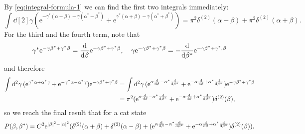 \documentclass[hyperref, a4paper]{article}
\newcommand*{\ee}{\mathrm{e}}
\begin{document}
\begin{itemize}
\[    \]
    By \eqref{eq:integral-formula-1} we can find the first two integrals immediately:
    \[
        \int \dd[2]{\gamma} (\ee^{-\gamma^* (\alpha - \beta) + \gamma (\alpha^* - \beta^*)} + \ee^{\gamma^* (\alpha + \beta) - \gamma (\alpha^* + \beta^*)} ) = \pi^2 \delta^{(2)}(\alpha - \beta) + \pi^2 \delta^{(2)}(\alpha + \beta).
    \]
    For the third and the fourth term, note that 
    \[
        \gamma^* \ee^{- \gamma \beta^* + \gamma^* \beta} = \dv{\beta} \ee^{- \gamma \beta^* + \gamma^* \beta}, \quad \gamma \ee^{- \gamma \beta^* + \gamma^* \beta} = - \dv{\beta^*} \ee^{- \gamma \beta^* + \gamma^* ,\beta}
    \]
    and therefore
    \[
        \begin{aligned}
            \int \dd[2]{\gamma} (\ee^{\gamma^* \alpha + \alpha^* \gamma} + \ee^{- \gamma^* \alpha - \alpha^* \gamma}) \ee^{- \gamma \beta^* + \gamma^* \beta} &= \int \dd[2]{\gamma} (\ee^{ \alpha \dv{\beta} - \alpha^* \dv{\beta^*}} + \ee^{- \alpha \dv{\beta} + \alpha^* \dv{\beta^*}}) \ee^{- \gamma \beta^* + \gamma^* \beta} \\
            &= \pi^2 (\ee^{ \alpha \dv{\beta} - \alpha^* \dv{\beta^*}} + \ee^{- \alpha \dv{\beta} + \alpha^* \dv{\beta^*}}) \delta^{(2)}(\beta),
        \end{aligned}
    \]
    so we reach the final result that for a cat state
    \begin{equation}
        P(\beta, \beta^*) = C^2 \ee^{\abs{\beta}^2 - \abs{\alpha}^2} (\delta^{(2)}(\alpha+\beta) + \delta^{(2)}(\alpha - \beta) + (\ee^{ \alpha \dv{\beta} - \alpha^* \dv{\beta^*}} + \ee^{- \alpha \dv{\beta} + \alpha^* \dv{\beta^*}}) \delta^{(2)}(\beta)).
    \end{equation}
\end{itemize}
\end{document}
